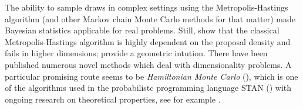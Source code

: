 The ability to sample draws in complex settings using the Metropolis-Hastings algorithm (and other Markov chain Monte Carlo methods for that matter) made Bayesian statistics applicable for real problems.
Still, \citet{Au2001EstimationOS} show that the classical Metropolis-Hastings algorithm is highly dependent on the proposal density and fails in higher dimensions; \citet{zuev08} provide a geometric intution.
There have been published numerous novel methods which deal with dimensionality problems.
A particular promising route seems to be \emph{Hamiltonian Monte Carlo} (\citet{duane87}), which is one of the algorithms used in the probabilistc programming language STAN (\citet{standev2018stancore}) with ongoing research on theoretical properties, see for example \citet{betancourt2014geometric}.


%
